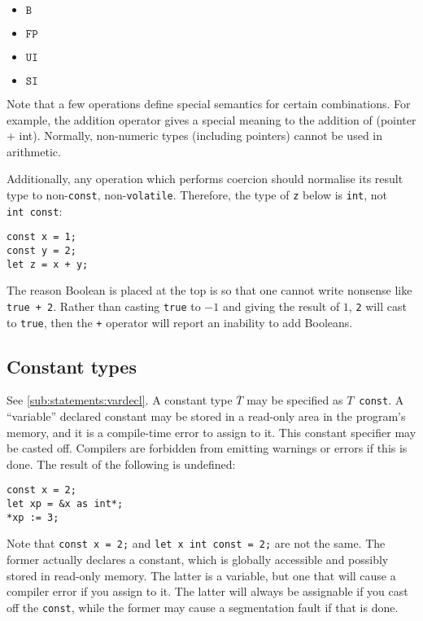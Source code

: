 \documentclass{article}
\newcommand{\R}[1]{\mathtt{#1}}
\begin{document}
\begin{itemize}
\item{$\R{B}$}
\item{$\R{FP}$}
\item{$\R{UI}$}
\item{$\R{SI}$}
\end{itemize}

Note that a few operations define special semantics for certain combinations.
For example, the addition operator gives a special meaning to the addition of
(pointer + int). Normally, non-numeric types (including pointers)
cannot be used in arithmetic.

Additionally, any operation which performs coercion should normalise its
result type to non-\texttt{const}, non-\texttt{volatile}.
Therefore, the type of \texttt{z} below
is \texttt{int}, not \texttt{int~const}:

\begin{verbatim}
const x = 1;
const y = 2;
let z = x + y;
\end{verbatim}

The reason Boolean is placed at the top is so that one cannot write nonsense
like \texttt{true~+~2}. Rather than casting \texttt{true} to $-1$ and giving
the result of $1$, \texttt{2} will cast to \texttt{true}, then the \texttt{+}
operator will report an inability to add Booleans.

\subsection{Constant types}
\label{sub:types:const}
See \ref{sub:statements:vardecl}.
A constant type $\overline{T}$ may be specified as $T$~\texttt{const}. A
``variable'' declared constant may be stored in a read-only area in the
program's memory, and it is a compile-time error to assign to it.
This constant specifier may be casted off. Compilers are forbidden from
emitting warnings or errors if this is done. The result of the following
is undefined:
\begin{verbatim}
const x = 2;
let xp = &x as int*;
*xp := 3;
\end{verbatim}

Note that \texttt{const~x~=~2;} and \texttt{let~x~int~const~=~2;} are not the
same. The former actually declares a constant, which is globally accessible and
possibly stored in read-only memory. The latter is a variable, but one that will
cause a compiler error if you assign to it. The latter will always be assignable
if you cast off the \texttt{const}, while the former may cause a segmentation
fault if that is done.
\end{document}

